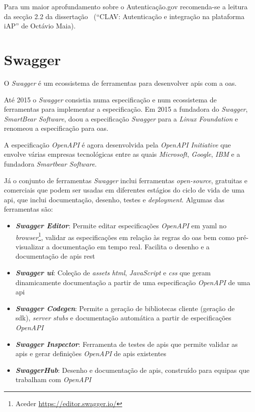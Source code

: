 Para um maior aprofundamento sobre o Autenticação.gov recomenda-se a leitura da secção 2.2 da dissertação~\cite{otavioTese} (``CLAV: Autenticação e integração na plataforma iAP'' de Octávio Maia).

\section{Swagger}
O \textit{Swagger} é um ecossistema de ferramentas para desenvolver \acrshort{api}s com a \acrfull{oas}.

Até 2015 o \textit{Swagger} consistia numa especificação e num ecossistema de ferramentas para implementar a especificação. Em 2015 a fundadora do \textit{Swagger}, \textit{SmartBear Software}, doou a especificação \textit{Swagger} para a \textit{Linux Foundation} e renomeou a especificação para \acrlong{oas}.~\cite{wiswagger}

A especificação \textit{OpenAPI} é agora desenvolvida pela \textit{OpenAPI Initiative} que envolve várias empresas tecnológicas entre as quais \textit{Microsoft}, \textit{Google}, \textit{IBM} e a fundadora \textit{Smartbear Software}.

Já o conjunto de ferramentas \textit{Swagger} inclui ferramentas \textit{open-source}, gratuitas e comerciais que podem ser usadas em diferentes estágios do ciclo de vida de uma \acrshort{api}, que inclui documentação, desenho, testes e \textit{deployment}. Algumas das ferramentas são:~\cite{swaggerVSoas}
\begin{itemize}
    \item \textbf{\textit{Swagger Editor}}: Permite editar especificações \textit{OpenAPI} em \acrshort{yaml} no \textit{browser}\footnote{Aceder \url{https://editor.swagger.io/}}, validar as especificações em relação às regras do \acrshort{oas} bem como pré-visualizar a documentação em tempo real. Facilita o desenho e a documentação de \acrshort{api}s \acrshort{rest}
    \item \textbf{\textit{Swagger \acrshort{ui}}}: Coleção de \textit{assets} \textit{\acrshort{html}}, \textit{JavaScript} e \textit{\acrshort{css}} que geram dinamicamente documentação a partir de uma especificação \textit{OpenAPI} de uma \acrshort{api}
    \item \textbf{\textit{Swagger Codegen}}: Permite a geração de bibliotecas cliente (geração de \acrshort{sdk}), \textit{server stubs} e documentação automática a partir de especificações \textit{OpenAPI}
    \item \textbf{\textit{Swagger Inspector}}: Ferramenta de testes de \acrshort{api}s que permite validar as \acrshort{api}s e gerar definições \textit{OpenAPI} de \acrshort{api}s existentes
    \item \textbf{\textit{SwaggerHub}}: Desenho e documentação de \acrshort{api}s, construído para equipas que trabalham com \textit{OpenAPI}
\end{itemize}

